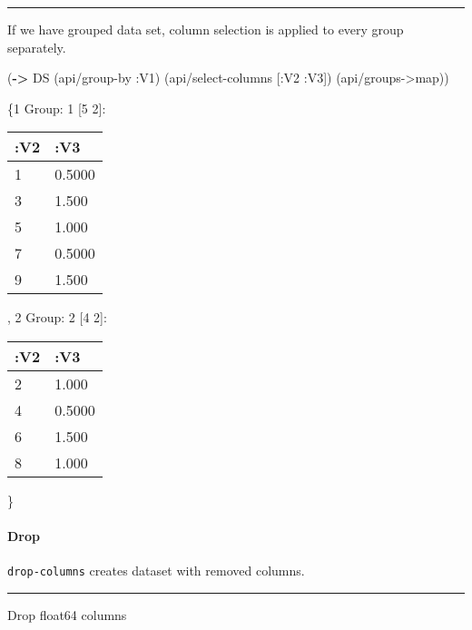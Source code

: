 \documentclass[]{article}
\newenvironment{Shaded}{\begin{snugshade}}{\end{snugshade}}
\newcommand{\KeywordTok}[1]{\textcolor[rgb]{0.13,0.29,0.53}{\textbf{#1}}}
\newcommand{\VariableTok}[1]{\textcolor[rgb]{0.00,0.00,0.00}{#1}}
\newcommand{\AttributeTok}[1]{\textcolor[rgb]{0.77,0.63,0.00}{#1}}
\newcommand{\NormalTok}[1]{#1}
\let\oldparagraph\paragraph
\renewcommand{\paragraph}[1]{\oldparagraph{#1}\mbox{}}
\begin{document}
\begin{center}\rule{0.5\linewidth}{0.5pt}\end{center}

If we have grouped data set, column selection is applied to every group
separately.

\begin{Shaded}
\begin{Highlighting}[]
\NormalTok{(}\KeywordTok{->}\NormalTok{ DS}
\NormalTok{    (api/group-by }\AttributeTok{:V1}\NormalTok{)}
\NormalTok{    (api/select-columns [}\AttributeTok{:V2} \AttributeTok{:V3}\NormalTok{])}
\NormalTok{    (api/groups->map))}
\end{Highlighting}
\end{Shaded}

\{1 Group: 1 {[}5 2{]}:

\begin{longtable}[]{@{}ll@{}}
\toprule
:V2 & :V3\tabularnewline
\midrule
\endhead
1 & 0.5000\tabularnewline
3 & 1.500\tabularnewline
5 & 1.000\tabularnewline
7 & 0.5000\tabularnewline
9 & 1.500\tabularnewline
\bottomrule
\end{longtable}

, 2 Group: 2 {[}4 2{]}:

\begin{longtable}[]{@{}ll@{}}
\toprule
:V2 & :V3\tabularnewline
\midrule
\endhead
2 & 1.000\tabularnewline
4 & 0.5000\tabularnewline
6 & 1.500\tabularnewline
8 & 1.000\tabularnewline
\bottomrule
\end{longtable}

\}

\paragraph{Drop}\label{drop}

\texttt{drop-columns} creates dataset with removed columns.

\begin{center}\rule{0.5\linewidth}{0.5pt}\end{center}

Drop float64 columns

\begin{Shaded}
\end{Shaded}
\end{document}
